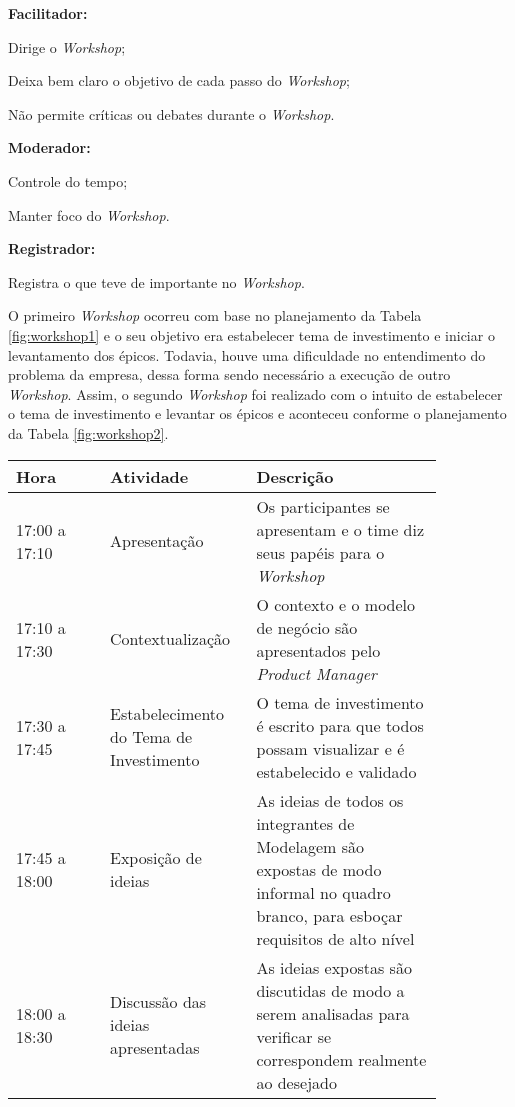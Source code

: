\textbf{Facilitador:}

	Dirige o \textit{Workshop};
	
	Deixa bem claro o objetivo de cada passo do \textit{Workshop};
	
	Não permite críticas ou debates durante o \textit{Workshop}.
		
\textbf{Moderador:}

	Controle do tempo;
	
	Manter foco do \textit{Workshop}.
	
\textbf{Registrador:}

	Registra o que teve de importante no \textit{Workshop}.
	
O primeiro \textit{Workshop} ocorreu com base no planejamento da Tabela \ref{fig:workshop1} e o seu objetivo
era estabelecer tema de investimento e iniciar o levantamento dos épicos. Todavia, houve uma dificuldade no entendimento
do problema da empresa, dessa forma sendo necessário a execução de outro \textit{Workshop}. 
Assim, o segundo \textit{Workshop} foi realizado com o intuito de estabelecer o tema de investimento e levantar os épicos e aconteceu conforme o planejamento da Tabela
\ref{fig:workshop2}.

\begin{table*}[!h]
\centering
\caption{Planejamento do \textit{Workshop} 1}
\label{fig:workshop1}
  \begin{tabular}{p{0.20\linewidth}p{0.25\linewidth}p{0.40\linewidth}}
  \hline
   Hora  & Atividade & Descrição\\
  \hline

  17:00 a 17:10 & Apresentação & Os participantes se apresentam e o time diz seus papéis para o \textit{Workshop}\\

  17:10 a 17:30  & Contextualização & O contexto e o modelo de negócio são apresentados pelo \textit{Product Manager}\\

  17:30 a 17:45 & Estabelecimento do Tema de Investimento & O tema de investimento é escrito para que todos possam visualizar e é estabelecido e validado\\
  
  17:45 a 18:00 & Exposição de ideias & As ideias de todos os integrantes de Modelagem são expostas de modo informal no quadro branco, para esboçar requisitos de alto nível\\

  18:00 a 18:30 & Discussão das ideias apresentadas & As ideias expostas são discutidas de modo a serem analisadas para verificar se correspondem realmente ao desejado\\

  \hline
  \end{tabular}
\end{table*}
\pagebreak


